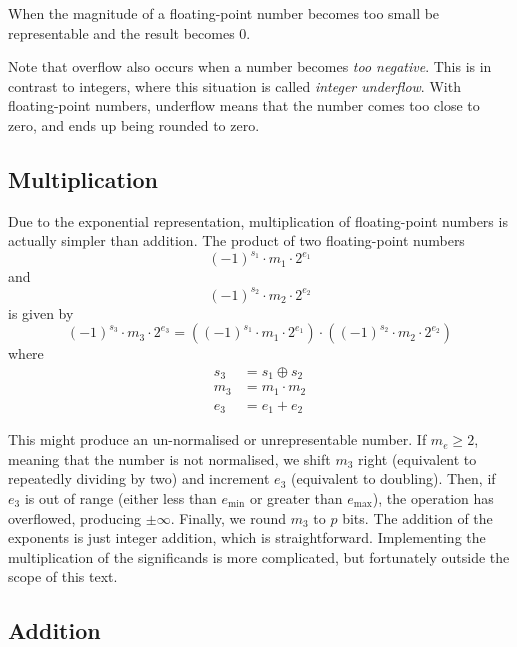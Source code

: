 \begin{definition}
  When the magnitude of a floating-point number becomes too small be
  representable and the result becomes $0$.
\end{definition}

Note that overflow also occurs when a number becomes \emph{too
  negative}.  This is in contrast to integers, where this situation is
called \emph{integer underflow}.  With floating-point numbers,
underflow means that the number comes too close to zero, and ends up
being rounded to zero.

\subsection{Multiplication}

Due to the exponential representation, multiplication of
floating-point numbers is actually simpler than addition.  The product
of two floating-point numbers
\[
  (-1)^{s_{1}} \cdot m_{1} \cdot 2^{e_{1}}
\]
and
\[
  (-1)^{s_{2}} \cdot m_{2} \cdot 2^{e_{2}}
\]
is given by
\begin{equation}
  (-1)^{s_{3}} \cdot m_{3} \cdot 2^{e_{3}} = ((-1)^{s_{1}} \cdot m_{1} \cdot 2^{e_{1}}) \cdot ((-1)^{s_{2}} \cdot m_{2} \cdot 2^{e_{2}})
\end{equation}
  where
  \begin{align}
    s_{3} &= s_{1} \oplus s_{2} \\
    m_{3} &= m_{1} \cdot m_{2} \\
    e_{3} &= e_{1} + e_{2}
  \end{align}

  This might produce an un-normalised or unrepresentable number.  If
  $m_{e}\geq{}2$, meaning that the number is not normalised, we shift
  $m_{3}$ right (equivalent to repeatedly dividing by two) and
  increment $e_{3}$ (equivalent to doubling).  Then, if $e_{3}$ is out
  of range (either less than $e_{\text{min}}$ or greater than
  $e_{\text{max}}$), the operation has overflowed, producing
  $\pm\infty$.  Finally, we round $m_{3}$ to $p$ bits.  The addition
  of the exponents is just integer addition, which is straightforward.
  Implementing the multiplication of the significands is more
  complicated, but fortunately outside the scope of this text.

\subsection{Addition}

